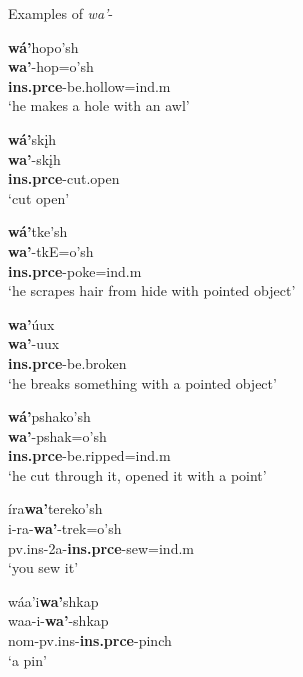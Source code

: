 \begin{exe}
\item\label{wa'examples} Examples of \textit{wa'}-

	\begin{xlist}
	
	\item \glll \textbf{wá'}hopo'sh\\
	\textbf{wa'}-hop=o'sh\\
	\textbf{ins.prce}-\textnormal{be.hollow}=ind.m\\
	\glt `he makes a hole with an awl' \citep[490]{hollow1970}
	
	\item \glll \textbf{wá'}skįh\\
	\textbf{wa'}-skįh\\
	\textbf{ins.prce}-\textnormal{cut.open}\\
	\glt `cut open' \citep[12]{kennard1936}
	
	\item \glll \textbf{wá'}tke'sh\\
	\textbf{wa'}-tkE=o'sh\\
	\textbf{ins.prce}-\textnormal{poke}=ind.m\\
	\glt `he scrapes hair from hide with pointed object' \citep[253]{hollow1970}

	\item \glll \textbf{wa'}úux\\
	\textbf{wa'}-uux\\
	\textbf{ins.prce}-\textnormal{be.broken}\\
	\glt `he breaks something with a pointed object' \citep[263]{hollow1970}
	
	\item \glll \textbf{wá'}pshako'sh\\
	\textbf{wa'}-pshak=o'sh\\
	\textbf{ins.prce}-\textnormal{be.ripped}=ind.m\\
	\glt `he cut through it, opened it with a point' \citep[153]{hollow1970}
	
	\item \glll íra\textbf{wa'}tereko'sh\\
	i-ra-\textbf{wa'}-trek=o'sh\\
	pv.ins-2a-\textbf{ins.prce}-\textnormal{sew}=ind.m\\
	\glt `you sew it' \citep[97]{hollow1970}
	
	\item \glll wáa'i\textbf{wa'}shkap\\
	waa-i-\textbf{wa'}-shkap\\
	nom-pv.ins-\textbf{ins.prce}-\textnormal{pinch}\\
	\glt `a pin' \citep[230]{hollow1970}
	
	\end{xlist}

\end{exe}

